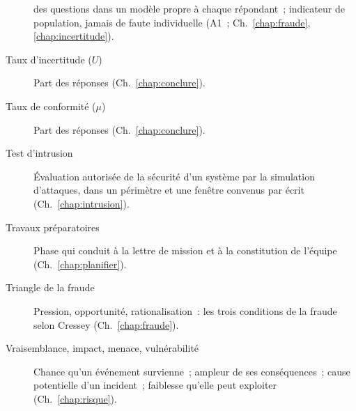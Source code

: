 \begin{description}
          des questions dans un modèle propre à chaque répondant~; indicateur
          de population, jamais de faute individuelle (A1~;
          Ch.~\ref{chap:fraude}, \ref{chap:incertitude}).
    \item[Taux d'incertitude ($U$)] Part des réponses \NEK{}
          (Ch.~\ref{chap:conclure}).
    \item[Taux de conformité ($\mu$)] Part des réponses \OUI{}
          (Ch.~\ref{chap:conclure}).
    \item[Test d'intrusion] Évaluation autorisée de la sécurité d'un
          système par la simulation d'attaques, dans un périmètre et une
          fenêtre convenus par écrit (Ch.~\ref{chap:intrusion}).
    \item[Travaux préparatoires] Phase qui conduit à la lettre de mission et
          à la constitution de l'équipe (Ch.~\ref{chap:planifier}).
    \item[Triangle de la fraude] Pression, opportunité, rationalisation~:
          les trois conditions de la fraude selon Cressey
          (Ch.~\ref{chap:fraude}).
    \item[Vraisemblance, impact, menace, vulnérabilité] Chance qu'un événement
          survienne~; ampleur de ses conséquences~; cause potentielle d'un
          incident~; faiblesse qu'elle peut exploiter (Ch.~\ref{chap:risque}).
\end{description}
